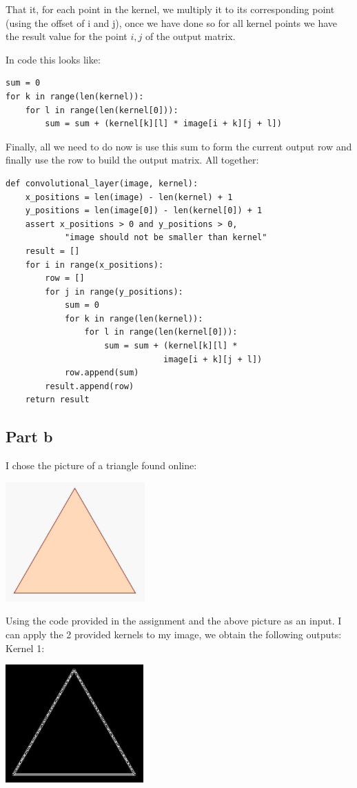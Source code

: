 \documentclass[10pt]{article}
\begin{document}
That it, for each point in the kernel, we multiply it to its corresponding point (using the offset
of i and j), once we have done so for all kernel points we have the result value for the
point ${i,j}$ of the output matrix.

In code this looks like:
\begin{lstlisting}
sum = 0
for k in range(len(kernel)):
    for l in range(len(kernel[0])):
        sum = sum + (kernel[k][l] * image[i + k][j + l])
\end{lstlisting}

Finally, all we need to do now is use this sum to form the current output row and
finally use the row to build the output matrix. All together:

\begin{lstlisting}
def convolutional_layer(image, kernel):
    x_positions = len(image) - len(kernel) + 1
    y_positions = len(image[0]) - len(kernel[0]) + 1
    assert x_positions > 0 and y_positions > 0, 
            "image should not be smaller than kernel"
    result = []
    for i in range(x_positions):
        row = []
        for j in range(y_positions):
            sum = 0
            for k in range(len(kernel)):
                for l in range(len(kernel[0])):
                    sum = sum + (kernel[k][l] * 
                                image[i + k][j + l])
            row.append(sum)
        result.append(row)
    return result
\end{lstlisting}

\subsection*{Part b}
I chose the picture of a triangle found online:

\begin{center}
    \includegraphics[scale=0.3]{triangle.PNG}
\end{center}

Using the code provided in the assignment and the above picture as an input.
I can apply the 2 provided kernels to my image, we obtain the following
outputs:
\vspace{5mm} %
Kernel 1:
\begin{center}
    \includegraphics[scale=0.3]{ml_triangle_1.PNG}
\end{center}
\end{document}
